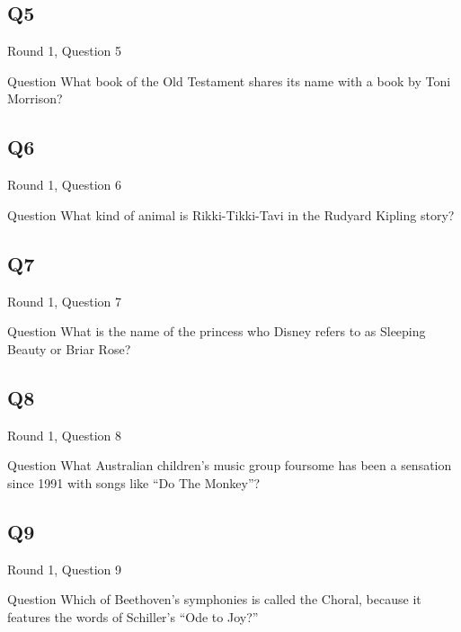 \documentclass[11pt]{beamer}
\begin{document}
\subsection*{Q5}
\begin{frame}[t]{Round 1, Question 5}
\vspace{2em}
\begin{block}{Question}
What book of the Old Testament shares its name with a book by Toni Morrison\@?
\end{block}
\end{frame}
    

\subsection*{Q6}
\begin{frame}[t]{Round 1, Question 6}
\vspace{2em}
\begin{block}{Question}
What kind of animal is Rikki-Tikki-Tavi in the Rudyard Kipling story\@?
\end{block}
\end{frame}
    

\subsection*{Q7}
\begin{frame}[t]{Round 1, Question 7}
\vspace{2em}
\begin{block}{Question}
What is the name of the princess who Disney refers to as Sleeping Beauty or Briar Rose\@?
\end{block}
\end{frame}
    

\subsection*{Q8}
\begin{frame}[t]{Round 1, Question 8}
\vspace{2em}
\begin{block}{Question}
What Australian children's music group foursome has been a sensation since 1991 with songs like ``Do The Monkey''\@?
\end{block}
\end{frame}
    

\subsection*{Q9}
\begin{frame}[t]{Round 1, Question 9}
\vspace{2em}
\begin{block}{Question}
Which of Beethoven's symphonies is called the Choral, because it features the words of Schiller's ``Ode to Joy?''
\end{block}
\end{frame}
    
\end{document}
